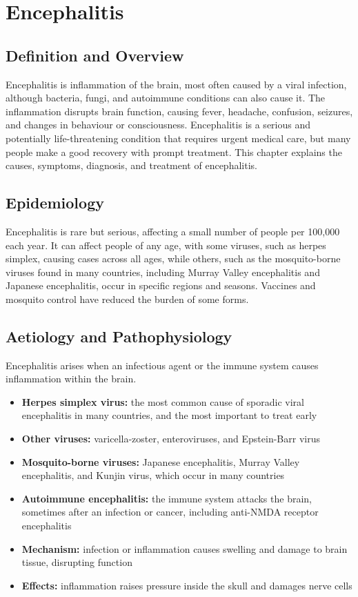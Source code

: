 \chapter{Encephalitis}

\section*{Definition and Overview}
Encephalitis is inflammation of the brain, most often caused by a viral infection, although bacteria, fungi, and autoimmune conditions can also cause it. The inflammation disrupts brain function, causing fever, headache, confusion, seizures, and changes in behaviour or consciousness. Encephalitis is a serious and potentially life-threatening condition that requires urgent medical care, but many people make a good recovery with prompt treatment. This chapter explains the causes, symptoms, diagnosis, and treatment of encephalitis.

\section*{Epidemiology}
Encephalitis is rare but serious, affecting a small number of people per 100,000 each year. It can affect people of any age, with some viruses, such as herpes simplex, causing cases across all ages, while others, such as the mosquito-borne viruses found in many countries, including Murray Valley encephalitis and Japanese encephalitis, occur in specific regions and seasons. Vaccines and mosquito control have reduced the burden of some forms.

\section*{Aetiology and Pathophysiology}
Encephalitis arises when an infectious agent or the immune system causes inflammation within the brain.
\begin{itemize}
    \item \textbf{Herpes simplex virus:} the most common cause of sporadic viral encephalitis in many countries, and the most important to treat early
    \item \textbf{Other viruses:} varicella-zoster, enteroviruses, and Epstein-Barr virus
    \item \textbf{Mosquito-borne viruses:} Japanese encephalitis, Murray Valley encephalitis, and Kunjin virus, which occur in many countries
    \item \textbf{Autoimmune encephalitis:} the immune system attacks the brain, sometimes after an infection or cancer, including anti-NMDA receptor encephalitis
    \item \textbf{Mechanism:} infection or inflammation causes swelling and damage to brain tissue, disrupting function
    \item \textbf{Effects:} inflammation raises pressure inside the skull and damages nerve cells
\end{itemize}

